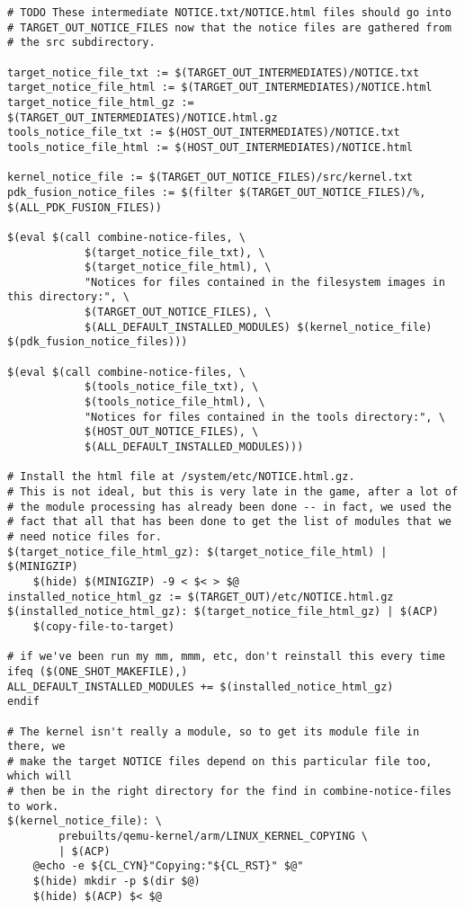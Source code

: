 \documentclass[12pt,a4paper]{article}
\begin{document}
\begin{verbatim}
# TODO These intermediate NOTICE.txt/NOTICE.html files should go into
# TARGET_OUT_NOTICE_FILES now that the notice files are gathered from
# the src subdirectory.

target_notice_file_txt := $(TARGET_OUT_INTERMEDIATES)/NOTICE.txt
target_notice_file_html := $(TARGET_OUT_INTERMEDIATES)/NOTICE.html
target_notice_file_html_gz := $(TARGET_OUT_INTERMEDIATES)/NOTICE.html.gz
tools_notice_file_txt := $(HOST_OUT_INTERMEDIATES)/NOTICE.txt
tools_notice_file_html := $(HOST_OUT_INTERMEDIATES)/NOTICE.html

kernel_notice_file := $(TARGET_OUT_NOTICE_FILES)/src/kernel.txt
pdk_fusion_notice_files := $(filter $(TARGET_OUT_NOTICE_FILES)/%, $(ALL_PDK_FUSION_FILES))

$(eval $(call combine-notice-files, \
			$(target_notice_file_txt), \
			$(target_notice_file_html), \
			"Notices for files contained in the filesystem images in this directory:", \
			$(TARGET_OUT_NOTICE_FILES), \
			$(ALL_DEFAULT_INSTALLED_MODULES) $(kernel_notice_file) $(pdk_fusion_notice_files)))

$(eval $(call combine-notice-files, \
			$(tools_notice_file_txt), \
			$(tools_notice_file_html), \
			"Notices for files contained in the tools directory:", \
			$(HOST_OUT_NOTICE_FILES), \
			$(ALL_DEFAULT_INSTALLED_MODULES)))

# Install the html file at /system/etc/NOTICE.html.gz.
# This is not ideal, but this is very late in the game, after a lot of
# the module processing has already been done -- in fact, we used the
# fact that all that has been done to get the list of modules that we
# need notice files for.
$(target_notice_file_html_gz): $(target_notice_file_html) | $(MINIGZIP)
	$(hide) $(MINIGZIP) -9 < $< > $@
installed_notice_html_gz := $(TARGET_OUT)/etc/NOTICE.html.gz
$(installed_notice_html_gz): $(target_notice_file_html_gz) | $(ACP)
	$(copy-file-to-target)

# if we've been run my mm, mmm, etc, don't reinstall this every time
ifeq ($(ONE_SHOT_MAKEFILE),)
ALL_DEFAULT_INSTALLED_MODULES += $(installed_notice_html_gz)
endif

# The kernel isn't really a module, so to get its module file in there, we
# make the target NOTICE files depend on this particular file too, which will
# then be in the right directory for the find in combine-notice-files to work.
$(kernel_notice_file): \
	    prebuilts/qemu-kernel/arm/LINUX_KERNEL_COPYING \
	    | $(ACP)
	@echo -e ${CL_CYN}"Copying:"${CL_RST}" $@"
	$(hide) mkdir -p $(dir $@)
	$(hide) $(ACP) $< $@



\end{verbatim}
\end{document}
